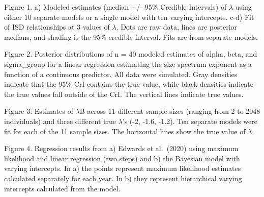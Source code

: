 \documentclass[
  12pt,
]{article}
\numberwithin{equation}
\begin{document}
Figure 1. a) Modeled estimates (median +/- 95\% Credible Intervals) of
\(\lambda\) using either 10 separate models or a single model with ten
varying intercepts. c-d) Fit of ISD relationships at 3 values of
\(\lambda\). Dots are raw data, lines are posterior medians, and shading
is the 95\% credible interval. Fits are from separate models.

Figure 2. Posterior distributions of n = 40 modeled estimates of alpha,
beta, and sigma\_group for a linear regression estimating the size
spectrum exponent as a function of a continuous predictor. All data were
simulated. Gray densities indicate that the 95\% CrI contains the true
value, while black densities indicate the true values fall outside of
the CrI. The vertical lines indicate true values.

Figure 3. Estimates of \(\lambda\)B across 11 different sample sizes
(ranging from 2 to 2048 individuals) and three different true
\(\lambda\)'s (-2, -1.6, -1.2). Ten separate models were fit for each of
the 11 sample sizes. The horizontal lines show the true value of
\(\lambda\).

Figure 4. Regression results from a) Edwards et al.~(2020) using maximum
likelihood and linear regression (two steps) and b) the Bayesian model
with varying intercepts. In a) the points represent maximum likelihood
estimates calculated separately for each year. In b) they represent
hierarchical varying intercepts calculated from the model.
\end{document}
